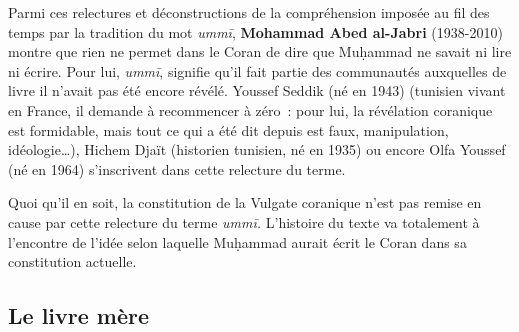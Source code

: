 Parmi ces relectures et déconstructions de la compréhension imposée au
fil des temps par la tradition du mot \emph{ummī}, \textbf{Mohammad Abed
al-Jabri} (1938-2010) montre que rien ne permet dans le Coran de dire
que Muḥammad ne savait ni lire ni écrire. Pour lui, \emph{ummī}, signifie qu'il
fait partie des communautés auxquelles de livre il n'avait pas été
encore révélé. Youssef Seddik (né en 1943) (tunisien vivant en France,
il demande à recommencer à zéro~: pour lui, la révélation coranique est
formidable, mais tout ce qui a été dit depuis est faux, manipulation,
idéologie\ldots), Hichem Djaït
(historien tunisien, né en 1935) ou encore Olfa Youssef (né en
1964) s'inscrivent dans cette relecture
du terme.



Quoi qu'il en soit, la constitution de la Vulgate coranique n'est pas
remise en cause par cette relecture du terme \emph{ummī.} L'histoire du
texte va totalement à l'encontre de l'idée selon laquelle Muḥammad
aurait écrit le Coran dans sa constitution actuelle.


\subsection{Le livre mère
}

